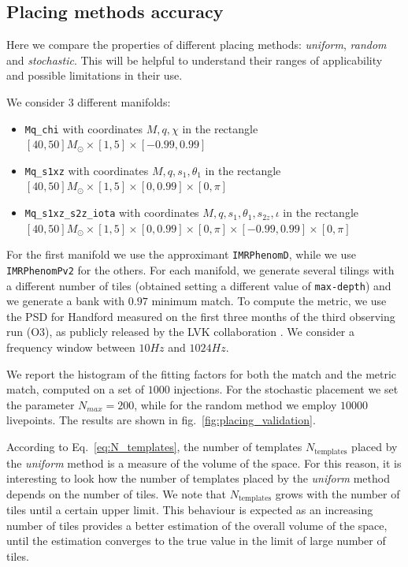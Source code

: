 \documentclass[twocolumn,showpacs,preprintnumbers,nofootinbib,prd,
superscriptaddress,10pt]{revtex4-2}
\begin{document}
\subsection{Placing methods accuracy} \label{sec:placing_accuracy}

Here we compare the properties of different placing methods: \textit{uniform}, \textit{random} and \textit{stochastic}.
This will be helpful to understand their ranges of applicability and possible limitations in their use.

We consider 3 different manifolds:
\begin{itemize}
	\item \texttt{Mq\_chi} with coordinates $M, q, \chi $ in the rectangle $[40, 50] M_\odot \times [1,5] \times [-0.99, 0.99]$
	\item \texttt{Mq\_s1xz} with coordinates $M, q, s_{1}, \theta_1$ in the rectangle $[40, 50] M_\odot \times [1,5] \times [0, 0.99] \times [0,\pi]$
	\item \texttt{Mq\_s1xz\_s2z\_iota} with coordinates $M, q, s_{1}, \theta_1, s_{2z}, \iota$ in the rectangle $[40, 50] M_\odot \times [1,5] \times [0, 0.99] \times [0,\pi] \times [-0.99, 0.99] \times [0, \pi]$
\end{itemize}
For the first manifold we use the approximant \texttt{IMRPhenomD}, while we use \texttt{IMRPhenomPv2} for the others.
For each manifold, we generate several tilings with a different number of tiles (obtained setting a different value of \texttt{max-depth}) and we generate a bank with $0.97$ minimum match.
To compute the metric, we use the PSD for Handford measured on the first three months of the third observing run (O3), as publicly released by the LVK collaboration \cite{O3a_PSDs}.
We consider a frequency window between $10Hz$ and $1024Hz$.

We report the histogram of the fitting factors for both the match and the metric match, computed on a set of $1000$ injections.
For the stochastic placement we set the parameter $N_{max} = 200$, while for the random method we employ $10000$ livepoints.
The results are shown in fig.~\ref{fig:placing_validation}.

According to Eq.~\eqref{eq:N_templates}, the number of templates $N_{\text{templates}}$ placed by the {\it uniform} method is a measure of the volume of the space. For this reason, it is interesting to look how the number of templates placed by the {\it uniform} method depends on the number of tiles.
We note that $N_{\text{templates}}$ grows with the number of tiles until a certain upper limit. This behaviour is expected as an increasing number of tiles provides a better estimation of the overall volume of the space, until the estimation converges to the true value in the limit of large number of tiles. 
\end{document}
